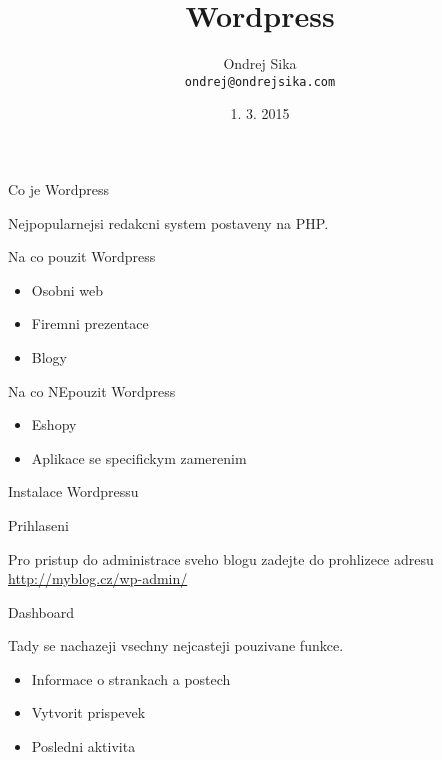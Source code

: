 \documentclass{beamer}
\title
    [Wordpress]
    {Wordpress}
\author
    [Ondrej Sika]
    {Ondrej Sika\\\texttt{ondrej@ondrejsika.com}}
\institute
    [Czechitas]
    {Czechitas\\\url{www.czechitas.cz}}
\date
    {1. 3. 2015}
\begin{document}
\maketitle

\begin{frame}
    {Co je Wordpress}

    Nejpopularnejsi redakcni system postaveny na PHP.
\end{frame}


\begin{frame}
    {Na co pouzit Wordpress}

    \begin{itemize}
        \item Osobni web
        \item Firemni prezentace
        \item Blogy
    \end{itemize}
\end{frame}


\begin{frame}
    {Na co NEpouzit Wordpress}

    \begin{itemize}
        \item Eshopy
        \item Aplikace se specifickym zamerenim
    \end{itemize}
\end{frame}


\begin{frame}
    {Instalace Wordpressu}

\end{frame}


\begin{frame}
    {Prihlaseni}

    Pro pristup do administrace sveho blogu zadejte do prohlizece adresu \url{http://myblog.cz/wp-admin/}
\end{frame}

\begin{frame}
    {Dashboard}

    Tady se nachazeji vsechny nejcasteji pouzivane funkce.

    \begin{itemize}
        \item Informace o strankach a postech
        \item Vytvorit prispevek
        \item Posledni aktivita
    \end{itemize}
\end{frame}
\end{document}
